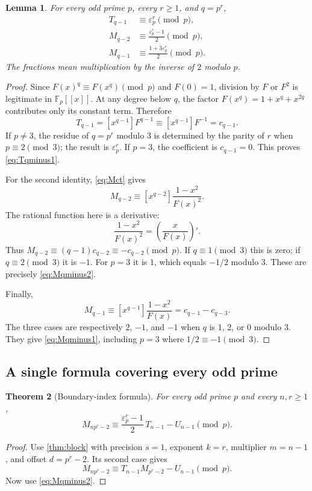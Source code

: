 \documentclass[11pt,a4paper]{article}
\numberwithin{equation}{section}
\newtheorem{theorem}{Theorem}[section]
\newtheorem{lemma}[theorem]{Lemma}
\theoremstyle{definition}
\theoremstyle{remark}
\newcommand{\F}{\mathbb F}
\newcommand{\eps}{\varepsilon}
\begin{document}
\begin{lemma}\label{lem:baseboundary}
For every odd prime $p$, every $r\geq1$, and $q=p^r$,
\begin{align}
 T_{q-1}&\equiv\eps_p^r\pmod p,\label{eq:Tqminus1}\\
 M_{q-2}&\equiv\frac{\eps_p^r-1}{2}\pmod p,\label{eq:Mqminus2}\\
 M_{q-1}&\equiv\frac{1+3\eps_p^r}{2}\pmod p.\label{eq:Mqminus1}
\end{align}
The fractions mean multiplication by the inverse of $2$ modulo $p$.
\end{lemma}
\begin{proof}
Since $F(x)^q\equiv F(x^q)\pmod p$ and $F(0)=1$, division by $F$ or
$F^2$ is legitimate in $\F_p[[x]]$. At any degree below $q$, the
factor $F(x^q)=1+x^q+x^{2q}$ contributes only its constant term.
Therefore
\[
 T_{q-1}=[x^{q-1}]F^{q-1}\equiv[x^{q-1}]F^{-1}=c_{q-1}.
\]
If $p\ne3$, the residue of $q=p^r$ modulo $3$ is determined by the
parity of $r$ when $p\equiv2\pmod3$; the result is $\eps_p^r$.
If $p=3$, the coefficient is $c_{q-1}=0$. This proves
\eqref{eq:Tqminus1}.

For the second identity, \eqref{eq:Mct} gives
\[
 M_{q-2}\equiv[x^{q-2}]\frac{1-x^2}{F(x)^2}.
\]
The rational function here is a derivative:
\begin{equation}\label{eq:derivative}
 \frac{1-x^2}{F(x)^2}=\left(\frac{x}{F(x)}\right)'.
\end{equation}
Thus $M_{q-2}\equiv(q-1)c_{q-2}\equiv-c_{q-2}\pmod p$.
If $q\equiv1\pmod3$ this is zero; if $q\equiv2\pmod3$ it is $-1$.
For $p=3$ it is $1$, which equals $-1/2$ modulo $3$. These are precisely
\eqref{eq:Mqminus2}.

Finally,
\[
 M_{q-1}\equiv[x^{q-1}]\frac{1-x^2}{F(x)}=c_{q-1}-c_{q-3}.
\]
The three cases are respectively $2$, $-1$, and $-1$ when $q$ is
$1$, $2$, or $0$ modulo $3$. They give \eqref{eq:Mqminus1}, including
$p=3$ where $1/2\equiv-1\pmod3$.
\end{proof}

\subsection{A single formula covering every odd prime}
\begin{theorem}[Boundary-index formula]\label{thm:boundary}
For every odd prime $p$ and every $n,r\geq1$,
\begin{equation}\label{eq:unified}
 \boxed{\quad M_{np^r-2}\equiv
       \frac{\eps_p^r-1}{2}\,T_{n-1}-U_{n-1}\pmod p.\quad}
\end{equation}
\end{theorem}
\begin{proof}
Use \cref{thm:block} with precision $s=1$, exponent $k=r$, multiplier
$m=n-1$, and offset $d=p^r-2$. Its second case gives
\[
 M_{np^r-2}\equiv T_{n-1}M_{p^r-2}-U_{n-1}\pmod p.
\]
Now use \eqref{eq:Mqminus2}.
\end{proof}
\end{document}

